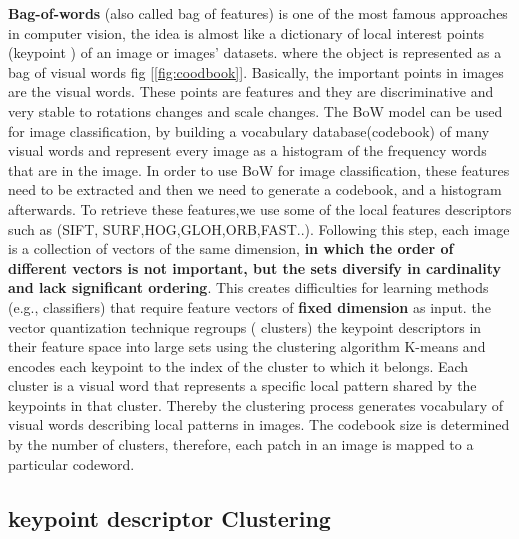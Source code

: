 \textbf{Bag-of-words} (also called bag of features) is one of the most famous approaches in computer vision, the idea is almost like a  dictionary of local interest points (keypoint ) of an image or images’ datasets. where the object is  represented as a bag of visual words fig [\ref{fig:coodbook}].
Basically, the important points in images are the visual words. These points are features  and they are discriminative and very stable to rotations changes and scale changes. 
The BoW model can be used for image classification, by building a vocabulary database(codebook) of many visual words and represent every image as a histogram of the frequency words that  are in  the image. In order to use BoW for image classification, these features need to be extracted and then we need to generate a codebook, and a histogram afterwards. To retrieve these features,we use some of the local features descriptors such as (SIFT, SURF,HOG,GLOH,ORB,FAST..).
Following this step, each image is a collection of  vectors of the same dimension, \textbf{in which the order of different vectors is not important, but the sets diversify in cardinality and lack significant ordering}. This creates difficulties for learning methods (e.g., classifiers) that  require feature vectors of  \textbf{fixed dimension}  as input.
the vector quantization technique regroups ( clusters)  the keypoint descriptors in their feature space into large sets using the clustering algorithm K-means and encodes each keypoint to the index of the cluster to which it belongs. Each cluster is a visual word that represents a specific local pattern shared by the keypoints in that cluster. Thereby the clustering process generates vocabulary of visual words describing local patterns in images. The codebook size is determined by the number of clusters, therefore, each patch in an image is mapped to a particular codeword.


\subsection{keypoint descriptor Clustering }

